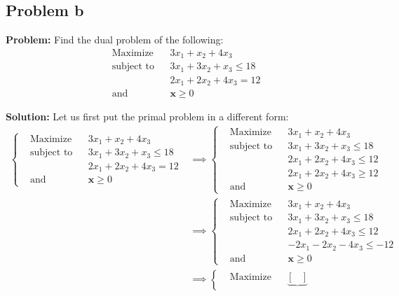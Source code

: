 \documentclass{article}
\renewcommand\vec{\mathbf}
\begin{document}
\subsection*{Problem b}
\noindent\textbf{Problem:} Find the dual problem of the following:
$$\begin{aligned}
    &{\text{Maximize}}
    &&3x_1+x_2+4x_3\\
    &{\text{subject to}}
    &&3x_1+3x_2+x_3\le18\\
    &
    &&2x_1+2x_2+4x_3=12\\
    &{\text{and}}
    &&\vec x\ge 0
\end{aligned}$$
\bigskip

\noindent\textbf{Solution:} Let us first put the primal problem in a different form:
\begin{align*}
    \left\{\begin{aligned}
        &{\text{Maximize}}
        &&3x_1+x_2+4x_3\\
        &{\text{subject to}}
        &&3x_1+3x_2+x_3\le18\\
        &
        &&2x_1+2x_2+4x_3=12\\
        &{\text{and}}
        &&\vec x\ge 0
    \end{aligned}\right.
    &\implies
    \left\{\begin{aligned}
        &{\text{Maximize}}
        &&3x_1+x_2+4x_3\\
        &{\text{subject to}}
        &&3x_1+3x_2+x_3\le18\\
        &
        &&2x_1+2x_2+4x_3\le12\\
        &
        &&2x_1+2x_2+4x_3\ge12\\
        &{\text{and}}
        &&\vec x\ge 0
    \end{aligned}\right.\\
    &\implies
    \left\{\begin{aligned}
        &{\text{Maximize}}
        &&3x_1+x_2+4x_3\\
        &{\text{subject to}}
        &&3x_1+3x_2+x_3\le18\\
        &
        &&2x_1+2x_2+4x_3\le12\\
        &
        &&-2x_1-2x_2-4x_3\le-12\\
        &{\text{and}}
        &&\vec x\ge 0
    \end{aligned}\right.\\
    &\implies
    \left\{\begin{aligned}
        &{\text{Maximize}}
        &&\underbrace{\begin{bmatrix}

\end{bmatrix}}
\end{aligned}
\end{align*}
\end{document}
